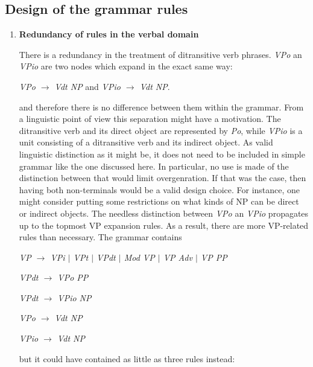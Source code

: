 \documentclass{article}
\begin{document}
\begin{description}
	\subsection{Design of the grammar rules}
	\begin{enumerate}
		\item
		\textbf{Redundancy of rules in the verbal domain}
		
		There is a redundancy in the treatment of ditransitive verb phrases. \emph{VPo} an \emph{VPio} are two nodes which expand in the exact same way:
		\begin{center}
			
			\emph{VPo $\rightarrow$ Vdt NP} and \emph{VPio $\rightarrow$ Vdt NP}.
			
		\end{center}
		and therefore there is no difference between them within the grammar. From a linguistic point of view this separation might have a motivation. The ditransitive verb and its direct object are represented by \emph{Po}, while \emph{VPio} is a unit consisting of a ditransitive verb and its indirect object. As valid linguistic distinction as it might be, it does not need to be included in simple grammar like the one discussed here. In particular, no use is made of the distinction between that would limit overgenration. If that was the case, then having both non-terminals would be a valid design choice. For instance, one might consider putting some restrictions on what kinds of NP can be direct or indirect objects.
		The needless distinction between \emph{VPo} an \emph{VPio} propagates up to the topmost VP expansion rules. As a result, there are more VP-related rules than necessary. The grammar contains
		\begin{center}
			
			\emph{VP $\rightarrow$ VPi $\vert$ VPt $\vert$ VPdt $\vert$ Mod VP $\vert$ VP Adv $\vert$ VP PP}
			
			\emph{VPdt $\rightarrow$ VPo PP}
			
			\emph{VPdt $\rightarrow$ VPio NP}
			
			\emph{VPo $\rightarrow$ Vdt NP}
			
			\emph{VPio $\rightarrow$ Vdt NP}
			
		\end{center}
		but it could have contained as little as three rules instead:
		
		\begin{center}
			

\end{center}
\end{enumerate}
\end{description}
\end{document}
